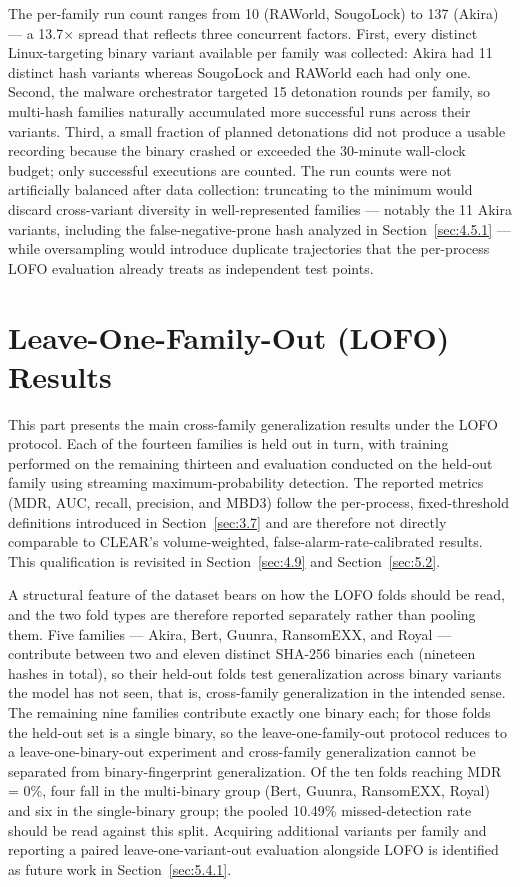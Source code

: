 The per-family run count ranges from 10 (RAWorld, SougoLock) to 137 (Akira) --- a 13.7$\times$ spread that reflects three concurrent factors. First, every distinct Linux-targeting binary variant available per family was collected: Akira had 11 distinct hash variants whereas SougoLock and RAWorld each had only one. Second, the malware orchestrator targeted 15 detonation rounds per family, so multi-hash families naturally accumulated more successful runs across their variants. Third, a small fraction of planned detonations did not produce a usable recording because the binary crashed or exceeded the 30-minute wall-clock budget; only successful executions are counted. The run counts were not artificially balanced after data collection: truncating to the minimum would discard cross-variant diversity in well-represented families --- notably the 11 Akira variants, including the false-negative-prone hash analyzed in Section~\ref{sec:4.5.1} --- while oversampling would introduce duplicate trajectories that the per-process LOFO evaluation already treats as independent test points.

\section{Leave-One-Family-Out (LOFO) Results}\label{sec:4.3}

This part presents the main cross-family generalization results under the LOFO protocol. Each of the fourteen families is held out in turn, with training performed on the remaining thirteen and evaluation conducted on the held-out family using streaming maximum-probability detection. The reported metrics (MDR, AUC, recall, precision, and MBD3) follow the per-process, fixed-threshold definitions introduced in Section~\ref{sec:3.7} and are therefore not directly comparable to CLEAR's volume-weighted, false-alarm-rate-calibrated results. This qualification is revisited in Section~\ref{sec:4.9} and Section~\ref{sec:5.2}.

A structural feature of the dataset bears on how the LOFO folds should be read, and the two fold types are therefore reported separately rather than pooling them. Five families --- Akira, Bert, Guunra, RansomEXX, and Royal --- contribute between two and eleven distinct SHA-256 binaries each (nineteen hashes in total), so their held-out folds test generalization across binary variants the model has not seen, that is, cross-family generalization in the intended sense. The remaining nine families contribute exactly one binary each; for those folds the held-out set is a single binary, so the leave-one-family-out protocol reduces to a leave-one-binary-out experiment and cross-family generalization cannot be separated from binary-fingerprint generalization. Of the ten folds reaching MDR = 0\%, four fall in the multi-binary group (Bert, Guunra, RansomEXX, Royal) and six in the single-binary group; the pooled 10.49\% missed-detection rate should be read against this split. Acquiring additional variants per family and reporting a paired leave-one-variant-out evaluation alongside LOFO is identified as future work in Section~\ref{sec:5.4.1}.

